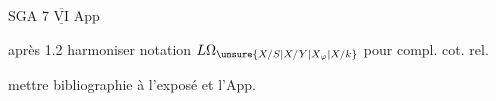 SGA 7 $\underline{\overline{\mathrm{VI}}}$ App

après 1.2 harmoniser notation $L\Omega_{\unsure{X/S|X/Y|X_{\varphi}|X/k}}$ pour compl. cot. rel.

mettre bibliographie  à l'exposé et l'App.

